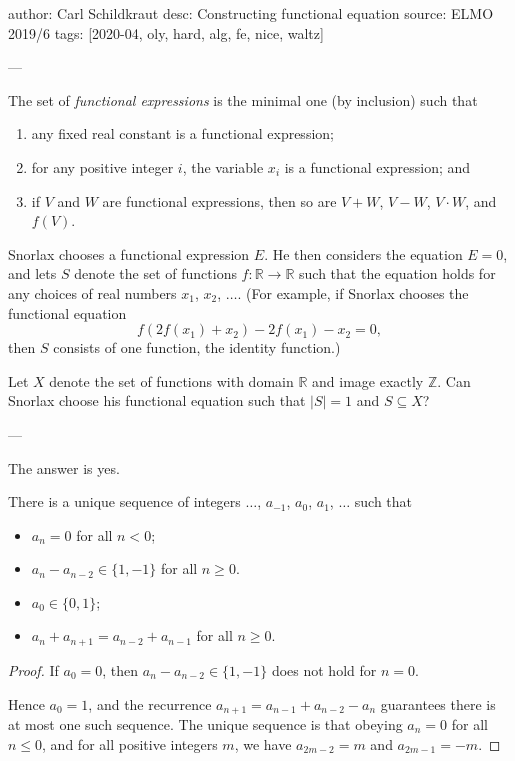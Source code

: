 author: Carl Schildkraut
desc: Constructing functional equation
source: ELMO 2019/6
tags: [2020-04, oly, hard, alg, fe, nice, waltz]

---

The set of \emph{functional expressions} is the minimal one (by inclusion) such that
\begin{enumerate}[label=(\roman*),itemsep=0em]
    \item any fixed real constant is a functional expression;
    \item for any positive integer $i$, the variable $x_i$ is a functional expression; and
    \item if $V$ and $W$ are functional expressions, then so are $V+W$, $V-W$, $V\cdot W$, and $f(V)$.
\end{enumerate}
Snorlax chooses a functional expression $E$. He then considers the equation $E=0$, and lets $S$ denote the set of functions $f:\mathbb R\to\mathbb R$ such that the equation holds for any choices of real numbers $x_1$, $x_2$, $\ldots$. (For example, if Snorlax chooses the functional equation \[f(2f(x_1)+x_2)-2f(x_1)-x_2=0,\]
then $S$ consists of one function, the identity function.)

Let $X$ denote the set of functions with domain $\mathbb R$ and image exactly $\mathbb Z$. Can Snorlax choose his functional equation such that $|S|=1$ and $S\subseteq X$?

---

The answer is yes.
\begin{claim*}
    There is a unique sequence of integers $\ldots$, $a_{-1}$, $a_0$, $a_1$, $\ldots$ such that
    \begin{itemize}[itemsep=0em]
    \item $a_n=0$ for all $n<0$;
    \item $a_n-a_{n-2}\in\{1,-1\}$ for all $n\ge0$.
    \item $a_0\in\{0,1\}$;
    \item $a_n+a_{n+1}=a_{n-2}+a_{n-1}$ for all $n\ge0$.
    \end{itemize}
\end{claim*}
\begin{proof}
    If $a_0=0$, then $a_n-a_{n-2}\in\{1,-1\}$ does not hold for $n=0$.

    Hence $a_0=1$, and the recurrence $a_{n+1}=a_{n-1}+a_{n-2}-a_n$ guarantees there is at most one such sequence. The unique sequence is that obeying $a_n=0$ for all $n\le0$, and for all positive integers $m$, we have $a_{2m-2}=m$ and $a_{2m-1}=-m$.
\end{proof}

